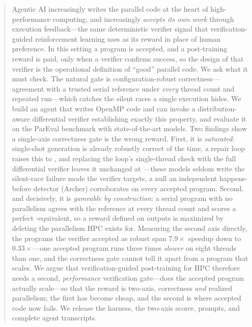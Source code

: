 \begin{abstract}
Agentic AI increasingly writes the parallel code at the heart of high-performance
computing, and increasingly \emph{accepts its own work} through execution
feedback---the same deterministic verifier signal that verification-guided
reinforcement learning uses as its reward in place of human preference. In this
setting a program is accepted, and a post-training reward is paid, only when a
verifier confirms success, so the design of that verifier is the operational
definition of ``good'' parallel code. We ask what it must check. The natural gate is
configuration-robust correctness---agreement with a trusted serial reference under
\emph{every} thread count and repeated run---which catches the silent races a single
execution hides. We build an agent that writes OpenMP code and can invoke a
distribution-aware differential verifier establishing exactly this property, and
evaluate it on the ParEval benchmark with \Nmodels{} state-of-the-art models. Two
findings show a single-axis correctness gate is the wrong reward. First, it is
\emph{saturated}: single-shot generation is already robustly correct \Lzerorate{} of
the time, a repair loop raises this to \Lonerate{}, and replacing the loop's
single-thread check with the full differential verifier leaves it unchanged at
\Ltworate{}---these models seldom write the silent-race failure mode the verifier
targets, a null an independent happens-before detector (Archer) corroborates on every
accepted program. Second, and decisively, it is \emph{gameable by construction}: a
serial program with no parallelism agrees with the reference at every thread count and
scores a perfect \Ltworate{}-equivalent, so a reward defined on outputs is maximized
by deleting the parallelism HPC exists for. Measuring the second axis directly, the
\Ntimed{} programs the verifier accepted as robust span $7.9\times$ speedup down to
$0.33\times$---one accepted program runs three times \emph{slower} on eight threads
than one, and the correctness gate cannot tell it apart from a program that scales. We
argue that verification-guided post-training for HPC therefore needs a second,
\emph{performance} verification gate---does the accepted program actually scale---so
that the reward is two-axis, correctness \emph{and} realized parallelism; the first
has become cheap, and the second is where accepted code now fails. We release the
harness, the two-axis scorer, prompts, and complete agent transcripts.
\end{abstract}

